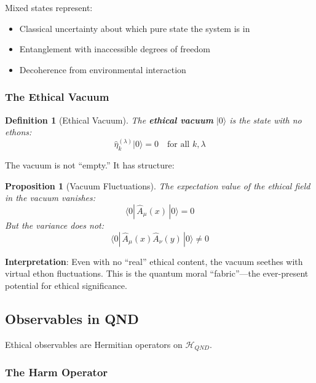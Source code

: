 \documentclass[12pt]{article}
\newtheorem{definition}{Definition}[section]
\newtheorem{proposition}{Proposition}[section]
\begin{document}
Mixed states represent:
\begin{itemize}
    \item Classical uncertainty about which pure state the system is in
    \item Entanglement with inaccessible degrees of freedom
    \item Decoherence from environmental interaction
\end{itemize}

\subsubsection{The Ethical Vacuum}

\begin{definition}[Ethical Vacuum]
The \textbf{ethical vacuum} $|0\rangle$ is the state with no ethons:
\begin{equation}
    \hat{\eta}_k^{(\lambda)} |0\rangle = 0 \quad \text{for all } k, \lambda
\end{equation}
\end{definition}

The vacuum is not ``empty.'' It has structure:

\begin{proposition}[Vacuum Fluctuations]
\emph{The expectation value of the ethical field in the vacuum vanishes:}
\begin{equation}
    \langle 0| \,\hat{A}_\mu(x)\, |0\rangle = 0
\end{equation}
\emph{But the variance does not:}
\begin{equation}
    \langle 0| \,\hat{A}_\mu(x) \hat{A}_\nu(y)\, |0\rangle \neq 0
\end{equation}
\end{proposition}

\textbf{Interpretation}: Even with no ``real'' ethical content, the vacuum seethes with virtual ethon fluctuations. This is the quantum moral ``fabric''---the ever-present potential for ethical significance.

\subsection{Observables in QND}

Ethical observables are Hermitian operators on $\mathcal{H}_{QND}$.

\subsubsection{The Harm Operator}
\end{document}
